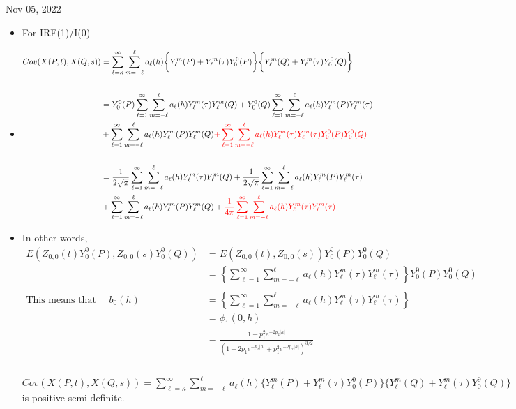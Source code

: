 \documentclass[11pt]{article}
\begin{document}

Nov 05, 2022
\begin{itemize}

\item For IRF(1)/I(0)\\

\item
\begin{align*}
Cov(X(P,t), X(Q,s)) &= \sum_{\ell=\kappa}^{\infty}  \sum_{m=-\ell}^{\ell} a_{\ell}(h) \biggl \{ Y_{\ell}^{m}(P) +  Y_{\ell}^{m}(\tau) Y_{0}^{0}(P) \biggl \} \biggl \{ Y_{\ell}^{m}(Q) +  Y_{\ell}^{m}(\tau) Y_{0}^{0}(Q) \biggl \}\\
\\
&= Y_{0}^{0}(P) \sum_{\ell=1}^{\infty} \sum_{m=-\ell}^{\ell}  a_{\ell}(h) Y_{\ell}^{m}(\tau) Y_{\ell}^{m}(Q) + Y_{0}^{0}(Q) \sum_{\ell=1}^{\infty} \sum_{m=-\ell}^{\ell}  a_{\ell}(h) Y_{\ell}^{m}(P) Y_{\ell}^{m}(\tau)\\
&+ \sum_{\ell=1}^{\infty} \sum_{m=-\ell}^{\ell}  a_{\ell}(h) Y_{\ell}^{m}(P) Y_{\ell}^{m}(Q) {\color{red} + \sum_{\ell=1}^{\infty} \sum_{m=-\ell}^{\ell} a_\ell(h) Y_{\ell}^{m}(\tau) Y_{\ell}^{m}(\tau) Y_{0}^{0}(P) Y_{0}^{0}(Q)}\\
\\
&= \frac{1}{2\sqrt{\pi}} \sum_{\ell=1}^{\infty} \sum_{m=-\ell}^{\ell}  a_{\ell}(h) Y_{\ell}^{m}(\tau) Y_{\ell}^{m}(Q) + \frac{1}{2\sqrt{\pi}} \sum_{\ell=1}^{\infty} \sum_{m=-\ell}^{\ell}  a_{\ell}(h) Y_{\ell}^{m}(P) Y_{\ell}^{m}(\tau)\\
&+ \sum_{\ell=1}^{\infty} \sum_{m=-\ell}^{\ell}  a_{\ell}(h) Y_{\ell}^{m}(P) Y_{\ell}^{m}(Q) + {\color{red} \frac{1}{4\pi} \sum_{\ell=1}^{\infty} \sum_{m=-\ell}^{\ell} a_\ell(h) Y_{\ell}^{m}(\tau) Y_{\ell}^{m}(\tau)}\\
\end{align*}

\item In other words,\\
\begin{align*}
E(Z_{0,0}(t) Y_0^0(P), Z_{0,0}(s) Y_0^0(Q)) &= E(Z_{0,0}(t) , Z_{0,0}(s) )Y_0^0(P) Y_0^0(Q)\\
&= \left\{ \sum_{\ell=1}^{\infty} \sum_{m=-\ell}^{\ell} a_\ell(h) Y_{\ell}^{m}(\tau) Y_{\ell}^{m}(\tau) \right\} Y_{0}^{0}(P) Y_{0}^{0}(Q)\\
\\
\text{This means that } \quad b_0(h) &= \left\{ \sum_{\ell=1}^{\infty} \sum_{m=-\ell}^{\ell} a_\ell(h) Y_{\ell}^{m}(\tau) Y_{\ell}^{m}(\tau) \right\}\\
&= \phi_1(0,h)\\ 
&= \frac{1-p_1^2 e^{-2p_2|h|}}{(1-2p_1e^{-p_2|h|} + p_1^2 e^{-2p_2|h|})^{3/2}}\\
\end{align*}
\\
$Cov(X(P,t), X(Q,s))= \sum_{\ell=\kappa}^{\infty}  \sum_{m=-\ell}^{\ell} a_{\ell}(h) \biggl \{ Y_{\ell}^{m}(P) +  Y_{\ell}^{m}(\tau) Y_{0}^{0}(P) \biggl \} \biggl \{ Y_{\ell}^{m}(Q) +  Y_{\ell}^{m}(\tau) Y_{0}^{0}(Q) \biggl \}$ is positive semi definite.\\



\end{itemize}
\end{document}
